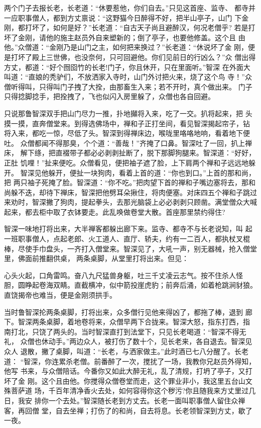 两个门子去报长老，长老道：“休要惹他，你们自去。”只见这首座、监寺、
都寺并一应职事僧人，都到方丈禀说：“这野猫今日醉得不好，把半山亭子，山门
下金刚，都打坏了，如何是好？”长老道：“自古天子尚且避醉汉，何况老僧乎?
若是打坏了金刚，请他的施主赵员外自来塑新的；倒了亭子，也要他修盖。这个且
由他。”众僧道：“金刚乃是山门之主，如何把来换过？”长老道：“休说坏了金
刚，便是打坏了殿上三世佛，也没奈何，只可回避他。你们见前日的行凶么？”众
僧出得方丈，都道：“好个囫囵竹的长老!门子，你且休开，只在里面听。”智深
在外面大叫道：“直娘的秃驴们，不放洒家入寺时，山门外讨把火来，烧了这个鸟
寺！”众僧听得叫，只得叫门子拽了大拴，由那畜生入来；若不开时，真个做出来。
门子只得捻脚捻手，把拴拽了，飞也似闪入房里躲了，众僧也各自回避。

只说那鲁智深双手把山门尽力一推，扑地攧将入来，吃了一交。扒将起来，把
头摸一摸，直奔僧堂来。到得选佛场中，禅和子正打坐间，看见智深揭起帘子，钻
将入来，都吃一惊，尽低了头。智深到得禅床边，喉咙里咯咯地响，看着地下便吐。
众僧都闻不得那臭，个个道：“善哉！”齐掩了口鼻。智深吐了一回，扒上禅床，
解下绦，把直裰带子都必必剥剥扯断了，脱下那脚狗腿来。智深道：“好好，正肚
饥哩！”扯来便吃。众僧看见，便把袖子遮了脸，上下肩两个禅和子远远地躲开。
智深见他躲开，便扯一块狗肉，看着上首的道：“你也到口。”上首的那和尚，把
两只袖子死掩了脸。智深道：“你不吃。”把肉望下首的禅和子嘴边塞将去，那和
尚躲不迭，却待下禅床，智深把他劈耳朵揪住，将肉便塞。对床四五个禅和子跳过
来劝时，智深撇了狗肉，提起拳头，去那光脑袋上必必剥剥只顾凿。满堂僧众大喊
起来，都去柜中取了衣钵要走。此乱唤做卷堂大散。首座那里禁约得住?

智深一味地打将出来，大半禅客都躲出廊下来。监寺、都寺不与长老说知，叫
起一班职事僧人，点起老郎、火工道人、直厅、轿夫，约有一二百人，都执杖叉棍
棒，尽使手巾盘头，一齐打入僧堂来。智深见了，大吼一声，别无器械，抢入僧堂
里，佛面前推翻供桌，两条桌脚，从堂里打将出来。但见：

心头火起，口角雷鸣。奋八九尺猛兽身躯，吐三千丈凌云志气。按不住杀人怪
胆，圆睁起卷海双睛。直截横冲，似中箭投崖虎豹；前奔后涌，如着枪跳涧豺狼。
直饶揭帝也难当，便是金刚须拱手。

当时鲁智深抡两条桌脚，打将出来，众多僧行见他来得凶了，都拖了棒，退到
廊下。智深两条桌脚，着地卷将来，众僧早两下合拢来。智深大怒，指东打西，指
南打北，只饶了两头的。当时智深直打到法堂下，只见长老喝道：“智深不得无礼，
众僧也休动手。”两边众人，被打伤了数十个，见长老来，各自退去。智深见众人
退散，撇了桌脚，叫道：“长老，与洒家做主。”此时酒已七八分醒了。长老道：
“智深，你连累杀老僧。前番醉了一次，搅扰了一场，我教你兄赵员外得知，他写
书来，与众僧陪话。今番你又如此大醉无礼，乱了清规，打坍了亭子，又打坏了金
刚。这个且由他。你搅得众僧卷堂而走，这个罪业非小，我这里五台山文殊菩萨道
场，千百年清净香火去处，如何容得你这个秽污?你且随我来方丈里过几日，我安
排你一个去处。”智深随长老到方丈去。长老一面叫职事僧人留住众禅客，再回僧
堂，自去坐禅；打伤了的和尚，自去将息。长老领智深到方丈，歇了一夜。

